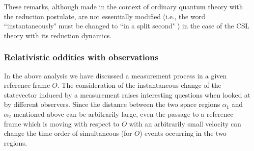 \documentclass[12pt]{article}
\begin{document}
These remarks, although made in the context of ordinary quantum
theory with the reduction postulate, are not essentially modified
(i.e., the word ``instantaneously" must be changed to ``in a split
second" \cite{bells}) in the case of the CSL theory with its
reduction dynamics.

\subsubsection{Relativistic oddities with observations}
\label{sec1013}

In the above analysis we have discussed a measurement process in a
given reference frame $O$. The consideration of the instantaneous
change of the statevector induced by a measurement raises
interesting questions when looked at by different observers. Since
the distance between the two space regions $\alpha_{1}$ and
$\alpha_{2}$ mentioned above can be arbitrarily large, even the
passage to a reference frame which is moving with respect to $O$
with an arbitrarily small velocity can change the time order of
simultaneous (for $O$) events occurring in the two regions.
\end{document}
